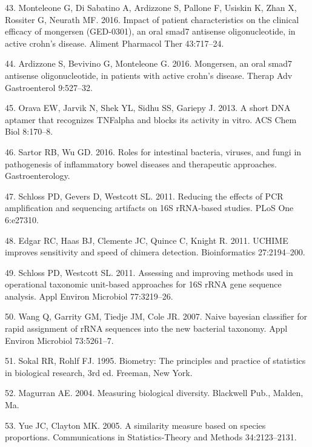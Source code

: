 \documentclass[11pt,]{article}
\begin{document}
\hypertarget{ref-monteleone_mongersen_2016}{}
43. Monteleone G, Di Sabatino A, Ardizzone S, Pallone F, Usiskin K, Zhan
X, Rossiter G, Neurath MF. 2016. Impact of patient characteristics on
the clinical efficacy of mongersen (GED-0301), an oral smad7 antisense
oligonucleotide, in active crohn's disease. Aliment Pharmacol Ther
43:717--24.

\hypertarget{ref-ardizzone_mongersen_2016}{}
44. Ardizzone S, Bevivino G, Monteleone G. 2016. Mongersen, an oral
smad7 antisense oligonucleotide, in patients with active crohn's
disease. Therap Adv Gastroenterol 9:527--32.

\hypertarget{ref-orava_short_2013}{}
45. Orava EW, Jarvik N, Shek YL, Sidhu SS, Gariepy J. 2013. A short DNA
aptamer that recognizes TNFalpha and blocks its activity in vitro. ACS
Chem Biol 8:170--8.

\hypertarget{ref-sartor_microbesIBD_2016}{}
46. Sartor RB, Wu GD. 2016. Roles for intestinal bacteria, viruses, and
fungi in pathogenesis of inflammatory bowel diseases and therapeutic
approaches. Gastroenterology.

\hypertarget{ref-schloss_PCRartifacts_2011}{}
47. Schloss PD, Gevers D, Westcott SL. 2011. Reducing the effects of PCR
amplification and sequencing artifacts on 16S rRNA-based studies. PLoS
One 6:e27310.

\hypertarget{ref-edgar_uchime_2011}{}
48. Edgar RC, Haas BJ, Clemente JC, Quince C, Knight R. 2011. UCHIME
improves sensitivity and speed of chimera detection. Bioinformatics
27:2194--200.

\hypertarget{ref-schloss_OTUanalysis_2011}{}
49. Schloss PD, Westcott SL. 2011. Assessing and improving methods used
in operational taxonomic unit-based approaches for 16S rRNA gene
sequence analysis. Appl Environ Microbiol 77:3219--26.

\hypertarget{ref-wang_taxonomy_2007}{}
50. Wang Q, Garrity GM, Tiedje JM, Cole JR. 2007. Naive bayesian
classifier for rapid assignment of rRNA sequences into the new bacterial
taxonomy. Appl Environ Microbiol 73:5261--7.

\hypertarget{ref-sokal_biometrystats_1995}{}
51. Sokal RR, Rohlf FJ. 1995. Biometry: The principles and practice of
statistics in biological research, 3rd ed. Freeman, New York.

\hypertarget{ref-magurran_measuring_2004}{}
52. Magurran AE. 2004. Measuring biological diversity. Blackwell Pub.,
Malden, Ma.

\hypertarget{ref-yue_thetaYC_2005}{}
53. Yue JC, Clayton MK. 2005. A similarity measure based on species
proportions. Communications in Statistics-Theory and Methods
34:2123--2131.
\end{document}
